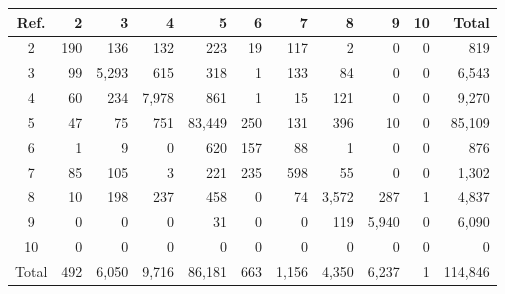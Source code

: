 \begin{tabular}{crrrrrrrrrr}
\toprule
Ref. & 2 & 3 & 4 & 5 & 6 & 7 & 8 & 9 & 10 & Total \\
\midrule
2 & 190 & 136 & 132 & 223 & 19 & 117 & 2 & 0 & 0 & 819 \\
3 & 99 & 5,293 & 615 & 318 & 1 & 133 & 84 & 0 & 0 & 6,543 \\
4 & 60 & 234 & 7,978 & 861 & 1 & 15 & 121 & 0 & 0 & 9,270 \\
5 & 47 & 75 & 751 & 83,449 & 250 & 131 & 396 & 10 & 0 & 85,109 \\
6 & 1 & 9 & 0 & 620 & 157 & 88 & 1 & 0 & 0 & 876 \\
7 & 85 & 105 & 3 & 221 & 235 & 598 & 55 & 0 & 0 & 1,302 \\
8 & 10 & 198 & 237 & 458 & 0 & 74 & 3,572 & 287 & 1 & 4,837 \\
9 & 0 & 0 & 0 & 31 & 0 & 0 & 119 & 5,940 & 0 & 6,090 \\
10 & 0 & 0 & 0 & 0 & 0 & 0 & 0 & 0 & 0 & 0 \\
\midrule
Total & 492 & 6,050 & 9,716 & 86,181 & 663 & 1,156 & 4,350 & 6,237 & 1 & 114,846 \\
\bottomrule
\end{tabular}
